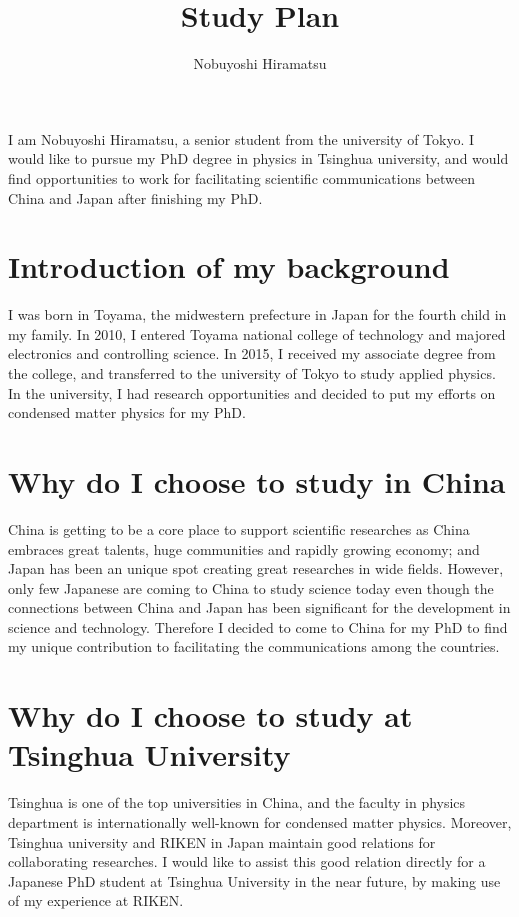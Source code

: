 \documentclass[aps,prb,reprint]{revtex4-1}
\begin{document}
\title{Study Plan}
\author{Nobuyoshi Hiramatsu}
\maketitle

I am Nobuyoshi Hiramatsu, a senior student from the university of Tokyo. I would like to pursue my PhD degree in physics in Tsinghua university, and would find opportunities to work for facilitating scientific communications between China and Japan after finishing my PhD.

\section{Introduction of my background}
I was born in Toyama, the midwestern prefecture in Japan for the fourth child in my family.  In 2010, I entered Toyama national college of technology and majored electronics and controlling science. In 2015, I received my associate degree from the college, and transferred to the university of Tokyo to study applied physics. In the university, I had research opportunities and decided to put my efforts on condensed matter physics for my PhD. 
 
\section{Why do I choose to study in China}
China is getting to be a core place to support scientific researches as China embraces great talents, huge communities and rapidly growing economy; and Japan has been an unique spot creating great researches in wide fields. However, only few Japanese are coming to China to study science today even though the connections between China and Japan has been significant for the development in science and technology. Therefore I decided to come to China for my PhD to find my unique contribution to facilitating the communications among the countries.

\section{Why do I choose to study at Tsinghua University}
Tsinghua is one of the top universities in China, and the faculty in physics department is internationally well-known for condensed matter physics.  Moreover, Tsinghua university and RIKEN in Japan maintain good relations for collaborating researches. I would like to assist this good relation directly for a Japanese PhD student at Tsinghua University in the near future, by making use of my experience at RIKEN. 
\end{document}
